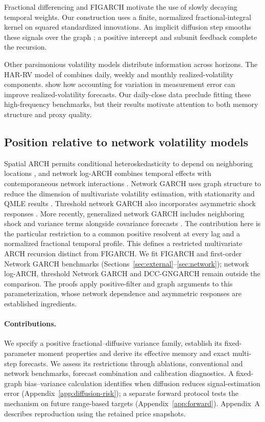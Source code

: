 \documentclass[12pt,a4paper]{article}
\begin{document}
Fractional differencing \citep{hosking1981} and FIGARCH \citep{baillie1996}
motivate the use of slowly decaying temporal weights. Our construction uses
a finite, normalized fractional-integral kernel on squared standardized
innovations. An implicit diffusion step smooths these signals over the graph
\citep{shuman2013}; a positive intercept and subunit feedback complete the recursion.

Other parsimonious volatility models distribute information across horizons.
The HAR-RV model of \citet{corsi2009} combines daily, weekly and monthly
realized-volatility components. \citet{bollerslev2016} show how accounting
for variation in measurement error can improve realized-volatility forecasts.
Our daily-close data preclude fitting these high-frequency benchmarks, but
their results motivate attention to both memory structure and proxy quality.

\subsection{Position relative to network volatility models}
Spatial ARCH permits conditional heteroskedasticity to depend on neighboring
locations \citep{otto2018}, and network log-ARCH combines temporal effects with
contemporaneous network interactions \citep{mattera2024}. Network GARCH uses
graph structure to reduce the dimension of
multivariate volatility estimation, with stationarity and QMLE results
\citep{zhou2020}. Threshold network GARCH also incorporates asymmetric shock
responses \citep{pan2024}. More recently, generalized network GARCH includes
neighboring shock and variance terms alongside covariance forecasts
\citep{zhou2026}. The contribution here is the particular restriction to a common
positive resolvent at every lag and a normalized fractional temporal profile.
This defines a restricted multivariate ARCH recursion distinct from FIGARCH.
We fit FIGARCH and first-order Network GARCH benchmarks
(Sections~\ref{sec:external}--\ref{sec:network}); network log-ARCH, threshold
Network GARCH and DCC-GNGARCH remain outside the comparison. The proofs apply
positive-filter and graph arguments to this parameterization, whose network
dependence and asymmetric responses are established ingredients.

\paragraph{Contributions.}
We specify a positive fractional--diffusive variance family, establish its
fixed-parameter moment properties and derive its effective memory and exact
multi-step forecasts. We assess its restrictions through ablations, conventional
and network benchmarks, forecast combination and calibration diagnostics.
A fixed-graph bias--variance calculation identifies when diffusion reduces
signal-estimation error (Appendix~\ref{app:diffusion-risk}); a separate forward
protocol tests the mechanism on future range-based targets
(Appendix~\ref{app:forward}).
Appendix~A describes reproduction using the retained price snapshots.
\end{document}

